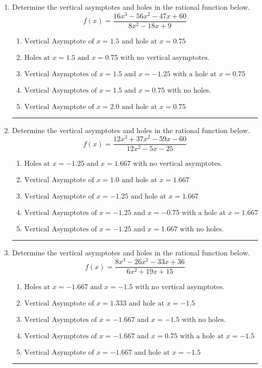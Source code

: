 \documentclass[14pt]{extbook}
\newcommand{\litem}[1]{\item#1\hspace*{-1cm}\rule{\textwidth}{0.4pt}}
\begin{document}
\begin{enumerate}
{\begin{enumerate}[label=\Alph*.]
\end{enumerate} }
\litem{
Determine the vertical asymptotes and holes in the rational function below.\[ f(x) = \frac{16x^{3} -56 x^{2} -47 x + 60}{8x^{2} -18 x + 9} \]\begin{enumerate}[label=\Alph*.]
\item \( \text{Vertical Asymptote of } x = 1.5 \text{ and hole at } x = 0.75 \)
\item \( \text{Holes at } x = 1.5 \text{ and } x = 0.75 \text{ with no vertical asymptotes.} \)
\item \( \text{Vertical Asymptotes of } x = 1.5 \text{ and } x = -1.25 \text{ with a hole at } x = 0.75 \)
\item \( \text{Vertical Asymptotes of } x = 1.5 \text{ and } x = 0.75 \text{ with no holes.} \)
\item \( \text{Vertical Asymptote of } x = 2.0 \text{ and hole at } x = 0.75 \)

\end{enumerate} }
\litem{
Determine the vertical asymptotes and holes in the rational function below.\[ f(x) = \frac{12x^{3} +37 x^{2} -59 x -60}{12x^{2} -5 x -25} \]\begin{enumerate}[label=\Alph*.]
\item \( \text{Holes at } x = -1.25 \text{ and } x = 1.667 \text{ with no vertical asymptotes.} \)
\item \( \text{Vertical Asymptote of } x = 1.0 \text{ and hole at } x = 1.667 \)
\item \( \text{Vertical Asymptote of } x = -1.25 \text{ and hole at } x = 1.667 \)
\item \( \text{Vertical Asymptotes of } x = -1.25 \text{ and } x = -0.75 \text{ with a hole at } x = 1.667 \)
\item \( \text{Vertical Asymptotes of } x = -1.25 \text{ and } x = 1.667 \text{ with no holes.} \)

\end{enumerate} }
\litem{
Determine the vertical asymptotes and holes in the rational function below.\[ f(x) = \frac{8x^{3} -26 x^{2} -33 x + 36}{6x^{2} +19 x + 15} \]\begin{enumerate}[label=\Alph*.]
\item \( \text{Holes at } x = -1.667 \text{ and } x = -1.5 \text{ with no vertical asymptotes.} \)
\item \( \text{Vertical Asymptote of } x = 1.333 \text{ and hole at } x = -1.5 \)
\item \( \text{Vertical Asymptotes of } x = -1.667 \text{ and } x = -1.5 \text{ with no holes.} \)
\item \( \text{Vertical Asymptotes of } x = -1.667 \text{ and } x = 0.75 \text{ with a hole at } x = -1.5 \)
\item \( \text{Vertical Asymptote of } x = -1.667 \text{ and hole at } x = -1.5 \)


\end{enumerate}}
\end{enumerate}
\end{document}
